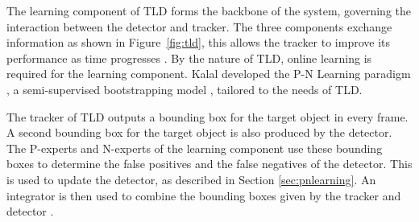   The learning component of TLD forms the backbone of the system, governing the interaction between the detector and tracker.
  The three components exchange information as shown in Figure~\ref{fig:tld}, this allows the tracker to improve its performance as time progresses \cite{Kalal2011}.
  By the nature of TLD, online learning is required for the learning component.
  Kalal developed the P-N Learning paradigm \cite{PNLearning}, a semi-supervised bootstrapping model \cite{murphy2012}, tailored to the needs of TLD.

  The tracker of TLD outputs a bounding box for the target object in every frame.
  A second bounding box for the target object is also produced by the detector.
  The P-experts and N-experts of the learning component use these bounding boxes to determine the false positives and the false negatives of the detector.
  This is used to update the detector, as described in Section \ref{sec:pnlearning}.
  An integrator is then used to combine the bounding boxes given by the tracker and detector \cite{Kalal2011}.
